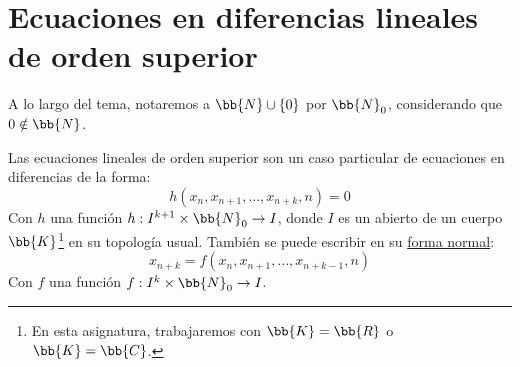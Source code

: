 \chapter{Ecuaciones en diferencias lineales de orden superior}\label{chp:Tema2}

\begin{notacion}
    A lo largo del tema, notaremos a $\bb{N}\cup \{0\}$ por $\bb{N}_0$, considerando que $0\notin \bb{N}$.
\end{notacion}


Las ecuaciones lineales de orden superior son un caso particular de ecuaciones en diferencias de la forma:
\begin{equation*}
    h(x_n, x_{n+1}, \ldots, x_{n+k}, n) = 0
\end{equation*}
Con $h$ una función $h:I^{k+1}\times \bb{N}_0 \to I$, donde $I$ es un abierto de un cuerpo $\bb{K}$\footnote{En esta asignatura, trabajaremos con $\bb{K}=\bb{R}$ o $\bb{K}=\bb{C}$.} en su topología usual. También se puede escribir en su \ul{forma normal}:
\begin{equation*}
    x_{n+k} = f(x_n, x_{n+1}, \ldots, x_{n+k-1}, n)
\end{equation*}
Con $f$ una función $f:I^k\times \bb{N}_0 \to I$.

